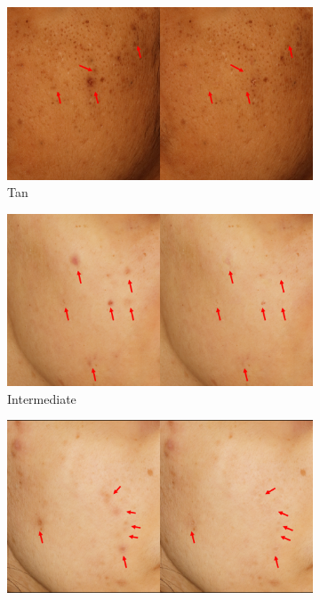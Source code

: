 \begin{appendices}
\begin{spacing}{1.5}
\begin{figure}[p]
      \begin{subfigure}{.5\textwidth}
        \centering
        \includegraphics[width=.9\linewidth]{Appendix/img/10.pdf}
        \caption{Tan}
      \end{subfigure}
    \begin{subfigure}{.5\textwidth}
        \centering
        \includegraphics[width=.9\linewidth]{Appendix/img/11.pdf}
        \caption{Intermediate}
      \end{subfigure}%
      \begin{subfigure}{.5\textwidth}
        \centering
        \includegraphics[width=.9\linewidth]{Appendix/img/12.pdf}

\end{subfigure}
\end{figure}
\end{spacing}
\end{appendices}
